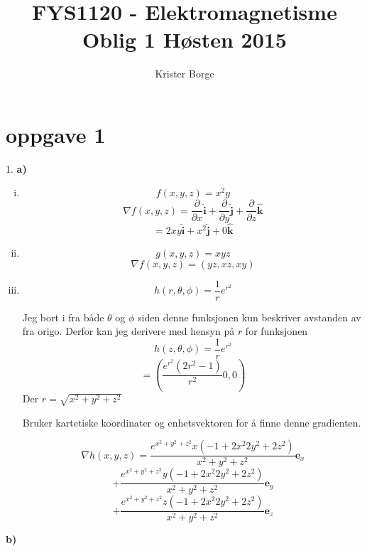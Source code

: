 \documentclass[11pt,a4paper, leqno]{report}
\title{{\large FYS1120 - Elektromagnetisme} \\Oblig 1 Høsten 2015}
\author{Krister Borge}
\newcommand{\ihat}{\boldsymbol{\hat{\textbf{i}}}}
\newcommand{\jhat}{\boldsymbol{\hat{\textbf{j}}}}
\newcommand{\khat}{\boldsymbol{\hat{\textbf{k}}}}
\newcommand{\partd}[1]{\frac {\partial} {\partial #1}}
\begin{document}
	\maketitle

\newpage

\section{oppgave 1}{1.}
\textbf{a)}
\begin{enumerate}[(i)]
	\item 
		$$ f(x, y, z)=x^{2}y$$
		$$\nabla f(x, y, z)=\partd x\ihat +\partd y \jhat+\partd z \khat $$
		$$=2xy\ihat + x^{2} \jhat + 0\khat$$
	\item 
		$$ g(x, y, z)=xyz$$
		$$\nabla f(x, y, z)=(yz, xz, xy)$$
	\item 
		$$ h(r, \theta, \phi)=\frac{1}{r} e^{r^{2}}$$

Jeg bort i fra både $\theta$ og $\phi$ siden denne funksjonen kun beskriver avstanden av fra origo.
Derfor kan jeg derivere med hensyn på $r$ for funksjonen
		$$ h(z, \theta, \phi)=\frac{1}{r} e^{r^{2}}$$
		$$=\left( \frac{e^{r^2} (2r^2-1)}{r^2} 0,0 \right)$$
Der $r=\sqrt{x^2 + y^2 + z^2}$

Bruker kartetiske koordinater og enhetsvektoren for å finne denne gradienten.

$$\nabla h(x, y, z)=\frac{e^{x^2 + y^2 + z^2} x(-1+2x^2 2y^2 + 2z^2)}{x^2 + y^2 + z^2} \textbf{e}_{x}$$
$$+ \frac{e^{x^2 + y^2 + z^2} y(-1+2x^2 2y^2 + 2z^2)}{x^2 + y^2 + z^2} \textbf{e}_{y}$$
$$+ \frac{e^{x^2 + y^2 + z^2} z(-1+2x^2 2y^2 + 2z^2)}{x^2 + y^2 + z^2} \textbf{e}_{z}$$

\end{enumerate}
\newpage
\textbf{b)}
\end{document}
